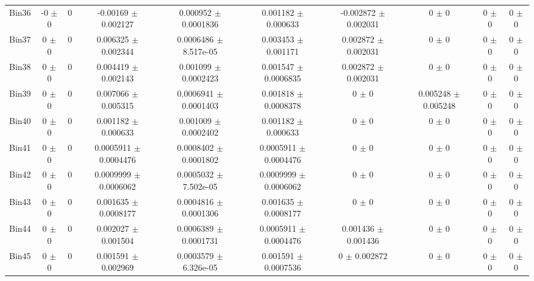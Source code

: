 \begin{tabular}{@{\extracolsep{4pt}}lccccccccc@{}}
     Bin36 & -0 $\pm$ 0 & 0 & -0.00169 $\pm$ 0.002127 & 0.000952 $\pm$ 0.0001836 & 0.001182 $\pm$ 0.000633 & -0.002872 $\pm$ 0.002031 & 0 $\pm$ 0 & 0 $\pm$ 0 & 0 $\pm$ 0 \\ 
     Bin37 & 0 $\pm$ 0 & 0 & 0.006325 $\pm$ 0.002344 & 0.0006486 $\pm$ 8.517e-05 & 0.003453 $\pm$ 0.001171 & 0.002872 $\pm$ 0.002031 & 0 $\pm$ 0 & 0 $\pm$ 0 & 0 $\pm$ 0 \\ 
     Bin38 & 0 $\pm$ 0 & 0 & 0.004419 $\pm$ 0.002143 & 0.001099 $\pm$ 0.0002423 & 0.001547 $\pm$ 0.0006835 & 0.002872 $\pm$ 0.002031 & 0 $\pm$ 0 & 0 $\pm$ 0 & 0 $\pm$ 0 \\ 
     Bin39 & 0 $\pm$ 0 & 0 & 0.007066 $\pm$ 0.005315 & 0.0006941 $\pm$ 0.0001403 & 0.001818 $\pm$ 0.0008378 & 0 $\pm$ 0 & 0.005248 $\pm$ 0.005248 & 0 $\pm$ 0 & 0 $\pm$ 0 \\ 
     Bin40 & 0 $\pm$ 0 & 0 & 0.001182 $\pm$ 0.000633 & 0.001009 $\pm$ 0.0002402 & 0.001182 $\pm$ 0.000633 & 0 $\pm$ 0 & 0 $\pm$ 0 & 0 $\pm$ 0 & 0 $\pm$ 0 \\ 
     Bin41 & 0 $\pm$ 0 & 0 & 0.0005911 $\pm$ 0.0004476 & 0.0008402 $\pm$ 0.0001802 & 0.0005911 $\pm$ 0.0004476 & 0 $\pm$ 0 & 0 $\pm$ 0 & 0 $\pm$ 0 & 0 $\pm$ 0 \\ 
     Bin42 & 0 $\pm$ 0 & 0 & 0.0009999 $\pm$ 0.0006062 & 0.0005032 $\pm$ 7.502e-05 & 0.0009999 $\pm$ 0.0006062 & 0 $\pm$ 0 & 0 $\pm$ 0 & 0 $\pm$ 0 & 0 $\pm$ 0 \\ 
     Bin43 & 0 $\pm$ 0 & 0 & 0.001635 $\pm$ 0.0008177 & 0.0004816 $\pm$ 0.0001306 & 0.001635 $\pm$ 0.0008177 & 0 $\pm$ 0 & 0 $\pm$ 0 & 0 $\pm$ 0 & 0 $\pm$ 0 \\ 
     Bin44 & 0 $\pm$ 0 & 0 & 0.002027 $\pm$ 0.001504 & 0.0006389 $\pm$ 0.0001731 & 0.0005911 $\pm$ 0.0004476 & 0.001436 $\pm$ 0.001436 & 0 $\pm$ 0 & 0 $\pm$ 0 & 0 $\pm$ 0 \\ 
     Bin45 & 0 $\pm$ 0 & 0 & 0.001591 $\pm$ 0.002969 & 0.0003579 $\pm$ 6.326e-05 & 0.001591 $\pm$ 0.0007536 & 0 $\pm$ 0.002872 & 0 $\pm$ 0 & 0 $\pm$ 0 & 0 $\pm$ 0 \\ 
\hline\hline
  \end{tabular}
